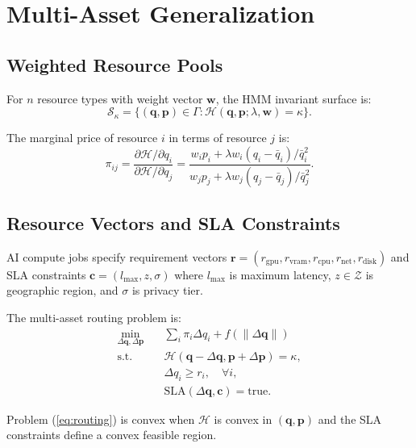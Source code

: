 \section{Multi-Asset Generalization}

\label{sec:multiasset}

\subsection{Weighted Resource Pools}

For $n$ resource types with weight vector $\bm{w}$, the HMM invariant surface is:
\begin{equation}
\mathcal{S}_\kappa = \{(\bm{q}, \bm{p}) \in \Gamma : \mathcal{H}(\bm{q}, \bm{p}; \lambda, \bm{w}) = \kappa\}.
\end{equation}

The marginal price of resource $i$ in terms of resource $j$ is:
\begin{equation}
\pi_{ij} = \frac{\partial \mathcal{H}/\partial q_i}{\partial \mathcal{H}/\partial q_j} = \frac{w_i p_i + \lambda w_i (q_i - \bar{q}_i)/\bar{q}_i^2}{w_j p_j + \lambda w_j (q_j - \bar{q}_j)/\bar{q}_j^2}.
\end{equation}

\subsection{Resource Vectors and SLA Constraints}

AI compute jobs specify requirement vectors $\bm{r} = (r_{\text{gpu}}, r_{\text{vram}}, r_{\text{cpu}}, r_{\text{net}}, r_{\text{disk}})$ and SLA constraints $\bm{c} = (l_{\max}, z, \sigma)$ where $l_{\max}$ is maximum latency, $z \in \mathcal{Z}$ is geographic region, and $\sigma$ is privacy tier.

The multi-asset routing problem is:
\begin{align}
\min_{\Delta\bm{q}, \Delta\bm{p}} \quad & \sum_i \pi_i \Delta q_i + f(\|\Delta\bm{q}\|) \label{eq:routing} \\
\text{s.t.} \quad & \mathcal{H}(\bm{q} - \Delta\bm{q}, \bm{p} + \Delta\bm{p}) = \kappa, \nonumber \\
& \Delta q_i \ge r_i, \quad \forall i, \nonumber \\
& \text{SLA}(\Delta\bm{q}, \bm{c}) = \text{true}. \nonumber
\end{align}

\begin{proposition}
Problem (\ref{eq:routing}) is convex when $\mathcal{H}$ is convex in $(\bm{q}, \bm{p})$ and the SLA constraints define a convex feasible region.
\end{proposition}

